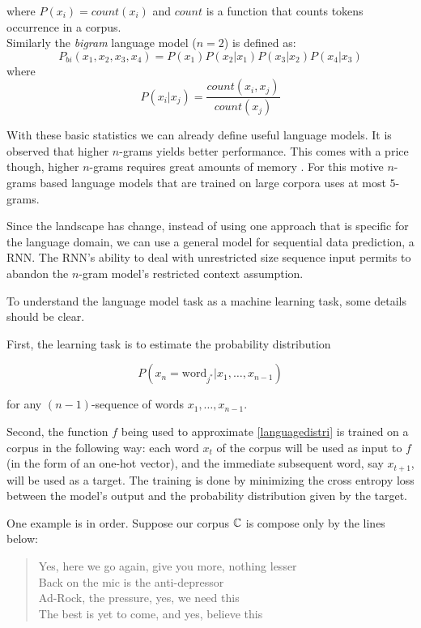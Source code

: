 where $P(x_i) = count(x_i)$ and $count$ is a function that counts tokens occurrence in a corpus.\\

Similarly the \textit{bigram} language model ($n=2$) is defined as: 
\begin{equation}
P_{bi}(x_1,x_2,x_3,x_4) = P(x_1)P(x_2\vert x_1)P(x_3\vert x_2)P(x_4\vert x_3)
\end{equation} 
where
\begin{equation}
P(x_i\vert x_j) = \frac{count(x_i, x_j)}{count(x_j)}
\end{equation} 

With these basic statistics we can already define useful language models. It is observed that higher $n$-grams yields better performance. This comes with a price though, higher $n$-grams requires great amounts of memory \cite{Heafield}. For this motive $n$-grams based language models that are trained on large corpora uses at most $5$-grams. 

Since \cite{Mikolov11} the landscape has change, instead of using one approach that is specific for the language domain, we can use a general model for sequential data prediction, a RNN. The RNN's ability to deal with unrestricted size sequence input permits to abandon the $n$-gram model's restricted context assumption.

To understand the language model task as a machine learning task, some details should be clear. 

First, the learning task is to estimate the probability distribution 

\begin{equation}
\label{languagedistri}
P(x_{n} = \text{word}_{j^{*}} | x_{1}, \dots ,x_{n-1})
\end{equation}

for any $(n-1)$-sequence of words $x_{1}, \dots ,x_{n-1}$.


Second, the function $f$ being used to approximate \ref{languagedistri} is trained on a corpus in the following way: each word $x_t$ of the corpus will be used as input to $f$ (in the form of an one-hot vector), and the immediate subsequent word, say $x_{t+1}$, will be used as a target. The training is done by minimizing the cross entropy loss between the model's output and the probability distribution given by the target.

One example is in order. Suppose our corpus $\mathbb{C}$ is compose only by the lines below:

\begin{quote}
Yes, here we go again, give you more, nothing lesser\\
Back on the mic is the anti-depressor\\
Ad-Rock, the pressure, yes, we need this\\
The best is yet to come, and yes, believe this\\
\end{quote}


